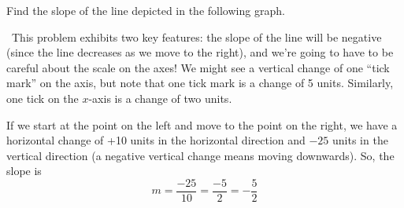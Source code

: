 \begin{boxex}
Find the slope of the line depicted in the following graph.

\begin{center}
\end{center}

\exsoln\ This problem exhibits two key features: the slope of the line will be negative (since the line decreases as we move to the right), and we're going to have to be careful about the scale on the axes! We might see a vertical change of one ``tick mark'' on the axis, but note that one tick mark is a change of 5 units. Similarly, one tick on the $x$-axis is a change of two units.

If we start at the point on the left and move to the point on the right, we have a horizontal change of +10 units in the horizontal direction and $-25$ units in the vertical direction (a negative vertical change means moving downwards). So, the slope is \[m = \frac{-25}{10} = \frac{-5}{2} = -\frac{5}{2}\]
\end{boxex}

